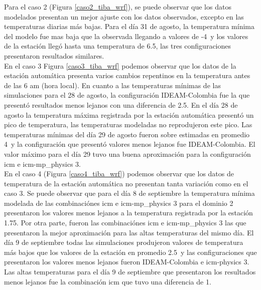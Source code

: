 Para el caso 2 (Figura \ref{caso2_tiba_wrf}), se puede observar que los datos modelados presentan un mejor ajuste con los datos observados, excepto en las temperaturas diarias más bajas. Para el día 31 de agosto, la temperatura mínima del modelo fue mas baja que la observada llegando a valores de -4\celc\ y los valores de la estación llegó hasta una temperatura de 6.5\celc, las tres configuraciones presentaron resultados similares.\\


En el caso 3 Figura \ref{caso3_tiba_wrf} podemos observar que los datos de la estación automática presenta varios cambios repentinos en la temperatura antes de las 6 am (hora local). En cuanto a las temperaturas mínimas de las simulaciones para el 28 de agosto, la configuración IDEAM-Colombia fue la que presentó resultados menos lejanos con una diferencia de 2.5\celsius. En el día 28 de agosto la temperatura máxima registrada por la estación automática presentó un pico de temperatura, las temperaturas modeladas no reprodujeron este pico. Las temperaturas mínimas del día 29 de agosto fueron sobre estimadas en promedio 4\celsius\ y la configuración que presentó valores menos lejanos fue IDEAM-Colombia. El valor máximo para el día 29 tuvo una buena aproximación para la configuración icm e icm-mp\_physics 3.\\

En el caso 4 (Figura \ref{caso4_tiba_wrf}) podemos observar que los datos de temperatura de la estación automática no presentan tanta variación como en el caso 3. Se puede observar que para el día 8 de septiembre la temperatura mínima modelada de las combinaciónes icm e icm-mp\_physics 3 para el dominio 2 presentaron los valores menos lejanos a la temperatura registrada por la estación 1.75\celsius. Por otra parte, fueron las combinaciónes icm e icm-mp\_physics 3 las que presentaron la mejor aproximación para las altas temperaturas del mismo día. El día 9 de septiembre todas las simulaciones produjeron valores de temperatura más bajos que los valores de la estación en promedio 2.5\celsius\ y las configuraciones que presentaron los valores menos lejanos fueron IDEAM-Colombia e icm-physics 3. Las altas temperaturas para el día 9 de septiembre que presentaron los resultados menos lejanos fue la combinación icm que tuvo una diferencia de 1\celsius.\\

